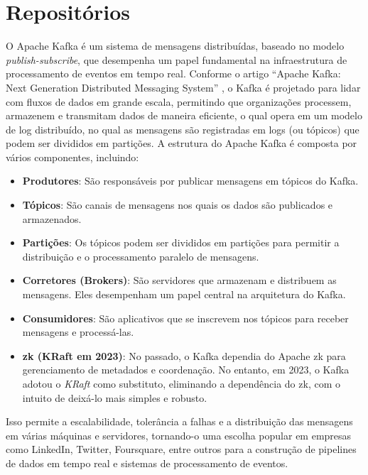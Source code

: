 \section{Repositórios}\label{sec:repositorios}

O Apache Kafka \cite{KafkaGitHub} é um sistema de mensagens distribuídas, baseado no modelo \textit{publish-subscribe}, que desempenha um papel fundamental na infraestrutura de processamento de eventos em tempo real. Conforme o artigo ``Apache Kafka: Next Generation Distributed Messaging System'' \cite{ApacheKafkaNextGenerationDistributedMessagingSystem:2010}, o Kafka é projetado para lidar com fluxos de dados em grande escala, permitindo que organizações processem, armazenem e transmitam dados de maneira eficiente, o qual opera em um modelo de log distribuído, no qual as mensagens são registradas em logs (ou tópicos) que podem ser divididos em partições. 
A estrutura do Apache Kafka é composta por vários componentes, incluindo:

\begin{itemize}
  \item \textbf{Produtores}: São responsáveis por publicar mensagens em tópicos do Kafka.
  \item \textbf{Tópicos}: São canais de mensagens nos quais os dados são publicados e armazenados.
  \item \textbf{Partições}: Os tópicos podem ser divididos em partições para permitir a distribuição e o processamento paralelo de mensagens.
  \item \textbf{Corretores (Brokers)}: São servidores que armazenam e distribuem as mensagens. Eles desempenham um papel central na arquitetura do Kafka.
  \item \textbf{Consumidores}: São aplicativos que se inscrevem nos tópicos para receber mensagens e processá-las.
  \item \textbf{\gls{zk} (KRaft em 2023)}: No passado, o Kafka dependia do Apache \gls{zk} para gerenciamento de metadados e coordenação. No entanto, em 2023, o Kafka adotou o \textit{KRaft} como substituto, eliminando a dependência do \gls{zk}, com o intuito de deixá-lo mais simples e robusto.
\end{itemize}

Isso permite a escalabilidade, tolerância a falhas e a distribuição das mensagens em várias máquinas e servidores, tornando-o uma escolha popular em empresas como LinkedIn, Twitter, Foursquare, entre outros para a construção de pipelines de dados em tempo real e sistemas de processamento de eventos.

